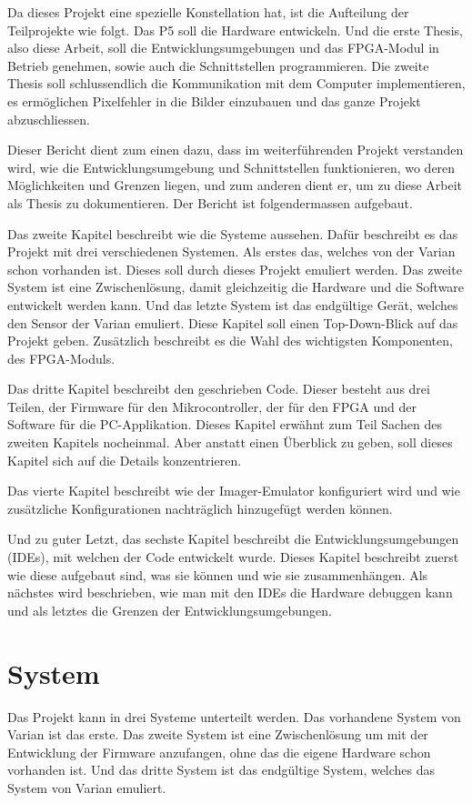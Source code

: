 \documentclass{article}
\begin{document}
Da dieses Projekt eine spezielle Konstellation hat, ist die Aufteilung der Teilprojekte wie folgt. Das P5 soll die Hardware entwickeln. Und die erste Thesis, also diese Arbeit, soll die Entwicklungsumgebungen und das FPGA-Modul in Betrieb genehmen, sowie auch die Schnittstellen programmieren. Die zweite Thesis soll schlussendlich die Kommunikation mit dem Computer implementieren, es ermöglichen Pixelfehler in die Bilder einzubauen und das ganze Projekt abzuschliessen.

Dieser Bericht dient zum einen dazu, dass im weiterführenden Projekt verstanden wird, wie die Entwicklungsumgebung und Schnittstellen funktionieren, wo deren Möglichkeiten und Grenzen liegen, und zum anderen dient er, um zu diese Arbeit als Thesis zu dokumentieren. Der Bericht ist folgendermassen aufgebaut.

Das zweite Kapitel beschreibt wie die Systeme aussehen. Dafür beschreibt es das Projekt mit drei verschiedenen Systemen. Als erstes das, welches von der Varian schon vorhanden ist. Dieses soll durch dieses Projekt emuliert werden. Das zweite System ist eine Zwischenlösung, damit gleichzeitig die Hardware und die Software entwickelt werden kann. Und das letzte System ist das endgültige Gerät, welches den Sensor der Varian emuliert. Diese Kapitel soll einen Top-Down-Blick auf das Projekt geben. Zusätzlich beschreibt es die Wahl des wichtigsten Komponenten, des FPGA-Moduls.

Das dritte Kapitel beschreibt den geschrieben Code. Dieser besteht aus drei Teilen, der Firmware für den Mikrocontroller, der für den FPGA und der Software für die PC-Applikation. Dieses Kapitel erwähnt zum Teil Sachen des zweiten Kapitels nocheinmal. Aber anstatt einen Überblick zu geben, soll dieses Kapitel sich auf die Details konzentrieren.

Das vierte Kapitel beschreibt wie der Imager-Emulator konfiguriert wird und wie zusätzliche Konfigurationen nachträglich hinzugefügt werden können.

Und zu guter Letzt, das sechste Kapitel beschreibt die Entwicklungsumgebungen (IDEs), mit welchen der Code entwickelt wurde. Dieses Kapitel beschreibt zuerst wie diese aufgebaut sind, was sie können und wie sie zusammenhängen. Als nächstes wird beschrieben, wie man mit den IDEs die Hardware debuggen kann und als letztes die Grenzen der Entwicklungsumgebungen.

\section{System}
Das Projekt kann in drei Systeme unterteilt werden. Das vorhandene System von Varian ist das erste. Das zweite System ist eine Zwischenlösung um mit der Entwicklung der Firmware anzufangen, ohne das die eigene Hardware schon vorhanden ist. Und das dritte System ist das endgültige System, welches das System von Varian emuliert.
\end{document}
